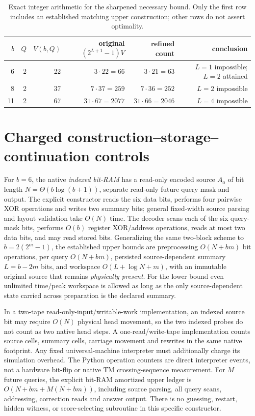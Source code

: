 \documentclass[10pt]{article}
\begin{document}
\begin{table}[h]\centering\small
\begin{tabular}{@{}rrrrrr@{}}\toprule
$b$&$Q$&$V(b,Q)$&original $(2^{L+1}-1)V$&refined count&conclusion\\\midrule
6&2&22&$3\cdot22=66$&$3\cdot21=63$&$L=1$ impossible; $L=2$ attained\\
8&2&37&$7\cdot37=259$&$7\cdot36=252$&$L=2$ impossible\\
11&2&67&$31\cdot67=2077$&$31\cdot66=2046$&$L=4$ impossible\\
\bottomrule
\end{tabular}
\caption{Exact integer arithmetic for the sharpened necessary bound. Only the first row includes an established matching upper construction; other rows do not assert optimality.}
\end{table}

\section{Charged construction--storage--continuation controls}
For \(b=6\), the native \emph{indexed bit-RAM} has a read-only encoded source \(A_a\) of bit length \(N=\Theta(b\log(b+1))\), separate read-only future query mask and output. The explicit constructor reads the six data bits, performs four pairwise XOR operations and writes two summary bits; general fixed-width source parsing and layout validation take \(O(N)\) time. The decoder scans each of the six query-mask bits, performs \(O(b)\) register XOR/address operations, reads at most two data bits, and may read stored bits. Generalizing the same two-block scheme to \(b=2(2^m-1)\), the established upper bounds are preprocessing \(O(N+bm)\) bit operations, per query \(O(N+bm)\), persisted source-dependent summary \(L=b-2m\) bits, and workspace \(O(L+\log N+m)\), with an immutable original source that remains \emph{physically present}. For the lower bound even unlimited time/peak workspace is allowed as long as the only source-dependent state carried across preparation is the declared summary.

In a two-tape read-only-input/writable-work implementation, an indexed source bit may require \(O(N)\) physical head movement, so the two indexed probes do not count as two native head steps. A one-read/write-tape implementation counts source cells, summary cells, carriage movement and rewrites in the same native footprint. Any fixed universal-machine interpreter must additionally charge its simulation overhead. The Python operation counters are direct interpreter events, not a hardware bit-flip or native TM crossing-sequence measurement. For \(M\) future queries, the explicit bit-RAM amortized upper ledger is \(O(N+bm+M(N+bm))\), including source parsing, all query scans, addressing, correction reads and answer output. There is no guessing, restart, hidden witness, or score-selecting subroutine in this specific constructor.
\end{document}
